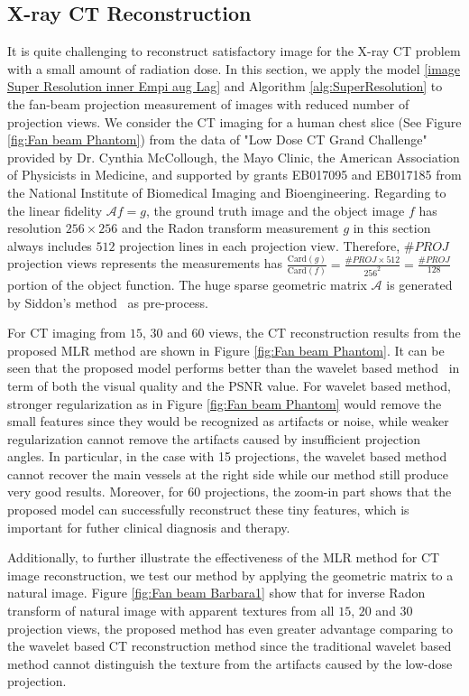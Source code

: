 \documentclass[letterpaper,10pt]{article}
\begin{document}
\subsection{X-ray CT Reconstruction}
It is quite challenging to reconstruct satisfactory image for the X-ray CT problem with a small amount of radiation dose.
In this section, we apply the model \eqref{image Super Resolution inner Empi aug Lag} and Algorithm \ref{alg:SuperResolution} to the fan-beam projection measurement of images with reduced number of projection views. We consider the CT imaging for a human chest slice (See Figure \ref{fig:Fan beam Phantom})  from the data of "Low Dose CT Grand Challenge" provided by Dr. Cynthia McCollough, the Mayo Clinic, the American Association of Physicists in Medicine, and supported by grants EB017095 and EB017185 from the National Institute of Biomedical Imaging and Bioengineering. Regarding to the linear fidelity $\mathcal{A}f=g$, the ground truth image and the object image $f$ has resolution $256 \times 256$ and the Radon transform measurement $g$ in this section always includes $512$ projection lines in each projection view. Therefore, $\#PROJ$ projection views represents the measurements has $\frac{\text{Card}(g)}{\text{Card}(f)}=\frac{\#PROJ\times 512}{256^2} =\frac{\#PROJ}{128} $ portion of the object function. The huge sparse geometric matrix $\mathcal{A}$ is generated by Siddon's method~\cite{Siddon} as pre-process.

For CT imaging from $15$, $30$ and $60$ views, the CT reconstruction results from the proposed MLR method are shown in Figure \ref{fig:Fan beam Phantom}. It can be seen that the proposed model performs better than the wavelet based method~\cite{DongLiShen2012} in term of both the visual quality and the PSNR value. For wavelet based method, stronger regularization as in Figure \ref{fig:Fan beam Phantom} would remove the small features since they would be recognized as artifacts or noise, while weaker regularization cannot remove the artifacts caused by insufficient projection angles. In particular, in the case with 15 projections, the wavelet based method cannot recover the main vessels at the right side while our method still produce very good results. Moreover, for 60 projections, the zoom-in part shows that the proposed model can successfully reconstruct these tiny features, which is important for futher clinical diagnosis and therapy.

Additionally, to further illustrate the effectiveness of the MLR method for CT image reconstruction, we test our method by applying the geometric matrix to a natural image. Figure \ref{fig:Fan beam Barbara1} show that for inverse Radon transform of natural image with apparent textures from all $15$, $20$ and $30$ projection views, the proposed method has even greater advantage comparing to the wavelet based CT reconstruction method since the traditional wavelet based method cannot distinguish the texture from the artifacts caused by the low-dose projection.
\end{document}
